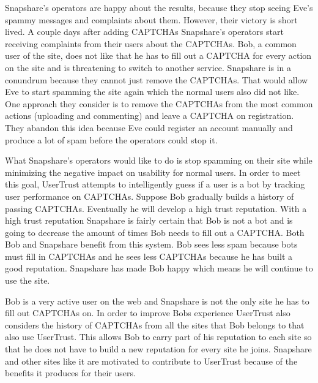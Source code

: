 \documentclass[journal, 12pt, onecolumn, draftclsnofoot]{IEEEtran}
\begin{document}
Snapshare's operators are happy about the results, because they stop seeing Eve's spammy messages and complaints about them. However, their victory is short lived. A couple days after adding CAPTCHAs Snapshare's operators start receiving complaints from their users about the CAPTCHAs. Bob, a common user of the site, does not like that he has to fill out a CAPTCHA for every action on the site and is threatening to switch to another service. Snapshare is in a conundrum because they cannot just remove the CAPTCHAs. That would allow Eve to start spamming the site again which the normal users also did not like. One approach they consider is to remove the CAPTCHAs from the most common actions (uploading and commenting) and leave a CAPTCHA on registration. They abandon this idea because Eve could register an account manually and produce a lot of spam before the operators could stop it.

What Snapshare's operators would like to do is stop spamming on their site while minimizing the negative impact on usability for normal users. In order to meet this goal, UserTrust attempts to intelligently guess if a user is a bot by tracking user performance on CAPTCHAs. Suppose Bob gradually builds a history of passing CAPTCHAs. Eventually he will develop a high trust reputation. With a high trust reputation Snapshare is fairly certain that Bob is not a bot and is going to decrease the amount of times Bob needs to fill out a CAPTCHA. Both Bob and Snapshare benefit from this system. Bob sees less spam because bots must fill in CAPTCHAs and he sees less CAPTCHAs because he has built a good reputation. Snapshare has made Bob happy which means he will continue to use the site.

Bob is a very active user on the web and Snapshare is not the only site he has to fill out CAPTCHAs on. In order to improve Bobs experience UserTrust also considers the history of CAPTCHAs from all the sites that Bob belongs to that also use UserTrust. This allows Bob to carry part of his reputation to each site so that he does not have to build a new reputation for every site he joins. Snapshare and other sites like it are motivated to contribute to UserTrust because of the benefits it produces for their users.
\end{document}
